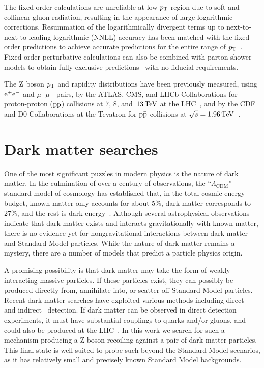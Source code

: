 The fixed order calculations are unreliable at low-$p_{\mathrm{T}}$ region due to soft 
and collinear gluon radiation, resulting in the appearance of large logarithmic 
corrections. Resummation of the logarithmically divergent terms up to 
next-to-next-to-leading logarithmic (NNLL) accuracy has been matched with the 
fixed order predictions to achieve accurate predictions for the entire range 
of $p_{\mathrm{T}}$~\cite{Balazs:1995nz,Catani:2015vma}. Fixed order perturbative 
calculations can also be combined with parton shower models to obtain 
fully-exclusive 
predictions~\cite{MCatNLO,Nason:2004rx,Frixione:2002ik,Alioli:2010xd} with
no fiducial requirements.      

The $\mathrm{Z}$ boson $p_{\mathrm{T}}$ and rapidity distributions have been previously 
measured, using $\mathrm{e}^+\mathrm{e}^-$ and $\mu^+\mu^-$ pairs, by the ATLAS, CMS, and 
LHCb Collaborations for proton-proton ($\mathrm{p}\mathrm{p}$) collisions at $7$, $8$, 
and~$13\,\text{Te\hspace{-.08em}V}$ at the LHC~\cite{ATLAS_ZpT7TeV,ATLAS_ZptEta7TeV,Aad:2015auj,Aaboud:2016btc,Sirunyan:2018owv,CMS_ZpT7TeV,CMS_ZpT8TeV,CMS:2014jea,Khachatryan:2016nbe,LHCb_WZ7TeV,LHCb_Zee7TeV,LHCb_ZpT7TeV,LHCb_WZ8TeV,Aaij:2016mgv}, 
and by the CDF and D0 Collaborations at the Tevatron for $\mathrm{p}\bar{\mathrm{p}}$ 
collisions at $\sqrt{s} = 1.96\,\text{Te\hspace{-.08em}V}$~\cite{Affolder:1999jh,Abbott:1999yd,TevatronWZ:D0PhysRevLett2008_100,TevatronWZ:D0PhysLettB2010_693,TevatronWZ:D0PhysRevLett2011_106}. 

\section{Dark matter searches}

One of the most significant puzzles in modern physics is the nature of dark matter.
In the culmination of over a century of observations, the ``$\Lambda_{\mathrm{CDM}}$'' standard model of cosmology
has established that, in the total cosmic energy budget,
known matter only accounts for about 5\%, dark matter corresponds to 27\%, and the rest is dark energy~\cite{Hinshaw_2013}.
Although several astrophysical observations indicate that dark matter exists and interacts gravitationally with known matter,
there is no evidence yet for nongravitational interactions between dark matter and Standard Model particles.
While the nature of dark matter remains a mystery, there are a number of models that predict a particle physics origin. 

A promising possibility is that dark matter may take the form of weakly interacting massive particles.
If these particles exist, they can possibly be produced directly from, annihilate into, or scatter off Standard Model particles.
Recent dark matter searches have exploited various methods including direct~\cite{Cushman:2013zza} and indirect~\cite{Buckley:2013bha} detection.
If dark matter can be observed in direct detection experiments,
it must have substantial couplings to quarks and/or gluons, and could also be produced at the LHC~\cite{Beltran:2010ww,Goodman:2010yf,Bai:2010hh,Goodman:2010ku,Fox:2011pm,Rajaraman:2011wf}.
In this work we search for such a mechanism producing a Z boson recoiling against a pair of dark matter particles.
This final state is well-suited to probe such beyond-the-Standard Model scenarios, as
it has relatively small and precisely known Standard Model backgrounds.
